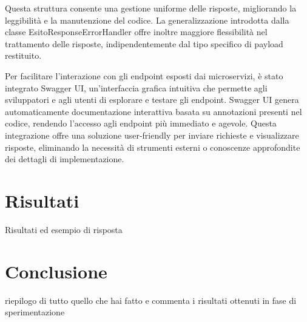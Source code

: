 \documentclass[a4paper,twoside,12pt]{toptesi}
\begin{document}
Questa struttura consente una gestione uniforme delle risposte, migliorando la leggibilità e la manutenzione del codice. La generalizzazione introdotta dalla classe EsitoResponseErrorHandler offre inoltre maggiore flessibilità nel trattamento delle risposte, indipendentemente dal tipo specifico di payload restituito.

Per facilitare l'interazione con gli endpoint esposti dai microservizi, è stato integrato Swagger UI, un'interfaccia grafica intuitiva che permette agli sviluppatori e agli utenti di esplorare e testare gli endpoint. Swagger UI genera automaticamente documentazione interattiva basata su annotazioni presenti nel codice, rendendo l'accesso agli endpoint più immediato e agevole. Questa integrazione offre una soluzione user-friendly per inviare richieste e visualizzare risposte, eliminando la necessità di strumenti esterni o conoscenze approfondite dei dettagli di implementazione.

\chapter{Risultati}

Risultati ed esempio di risposta

\chapter{Conclusione}
 riepilogo di tutto quello che hai fatto e commenta i risultati ottenuti in fase di sperimentazione

  


\end{document}
